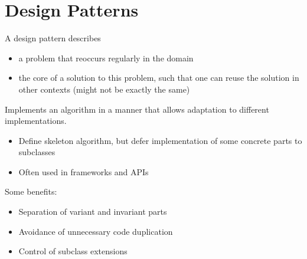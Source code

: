 \documentclass[
    ../../Software_Engineering_Summary.tex,
]
{subfiles}
\begin{document}
\section{Design Patterns}
A design pattern describes 
\begin{itemize}
    \item a problem that reoccurs regularly in the domain
    \item the core of a solution to this problem, such that one can reuse the solution in other contexts (might not be exactly the same)
\end{itemize}

\begin{defbox}
    Implements an algorithm in a manner that allows adaptation to different implementations.

    \begin{itemize}
        \item Define skeleton algorithm, but defer implementation of some concrete parts to subclasses
        \item Often used in frameworks and APIs
    \end{itemize}

    Some benefits:
    \begin{itemize}
        \item Separation of variant and invariant parts
        \item Avoidance of unnecessary code duplication
        \item Control of subclass extensions
    \end{itemize}
    
\end{defbox}
\end{document}
